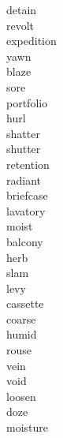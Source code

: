 \documentclass[a4paper, 11pt]{ctexart}
\begin{document}
\begin{multicols*}{3}
\begin{description}
\item[detain]

\item[revolt]

\item[expedition]

\item[yawn]

\item[blaze]

\item[sore]

\item[portfolio]

\item[hurl]

\item[shatter]

\item[shutter]

\item[retention]

\item[radiant]

\item[briefcase]

\item[lavatory]

\item[moist]

\item[balcony]

\item[herb]

\item[slam]

\item[levy]

\item[cassette]

\item[coarse]

\item[humid]

\item[rouse]

\item[vein]

\item[void]

\item[loosen]

\item[doze]

\item[moisture]


\end{description}
\end{multicols*}
\end{document}

